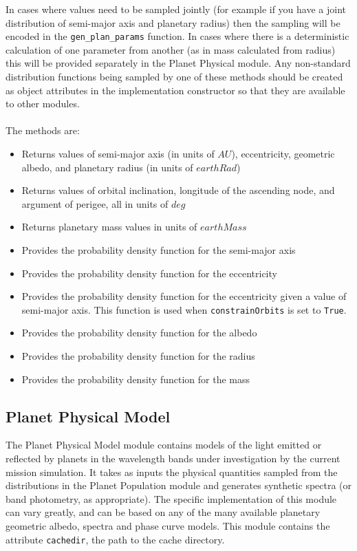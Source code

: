 \documentclass[cleanfoot]{asme2ej}
\begin{document}
In cases where values need to be sampled jointly (for example if you have a joint distribution of semi-major axis and planetary radius) then the sampling will be encoded in the \verb+gen_plan_params+ function.  In cases where there is a deterministic calculation of one parameter from another (as in mass calculated from radius) this will be provided separately in the Planet Physical module. Any non-standard distribution functions being sampled by one of these methods should be created as object attributes in the implementation constructor so that they are available to other modules.
\\\\
The methods are:
\begin{itemize}[leftmargin=1.5in,font={\ttfamily}]
    \item[\texttt gen\_plan\_params] Returns values of semi-major axis (in units of $ AU $), eccentricity, geometric albedo, and planetary radius (in units of $ earthRad $)
    \item[\texttt gen\_angles] Returns values of orbital inclination, longitude of the ascending node, and argument of perigee, all in units of $ deg $
    \item[\texttt gen\_mass] Returns planetary mass values in units of $earthMass$
    \item[\texttt dist\_sma] Provides the probability density function for the semi-major axis
    \item[\texttt dist\_eccen] Provides the probability density function for the eccentricity
    \item[\texttt dist\_eccen\_from\_sma] Provides the probability density function for the eccentricity given a value of semi-major axis. This function is used when \verb+constrainOrbits+ is set to \verb+True+.
    \item[\texttt dist\_albedo] Provides the probability density function for the albedo
    \item[\texttt dist\_radius] Provides the probability density function for the radius
    \item[\texttt dist\_mass] Provides the probability density function for the mass
\end{itemize}



\subsection{Planet Physical Model} \label{sec:planetphysicalmodel}
The Planet Physical Model module contains models of the light emitted or reflected by planets in the wavelength bands under investigation by the current mission simulation.  It takes as inputs the physical quantities sampled from the distributions in the Planet Population module and generates synthetic spectra (or band photometry, as appropriate).  The specific implementation of this module can vary greatly, and can be based on any of the many available planetary geometric albedo, spectra and phase curve models.  This module contains the attribute \texttt{cachedir}, the path to the cache directory.
\end{document}
